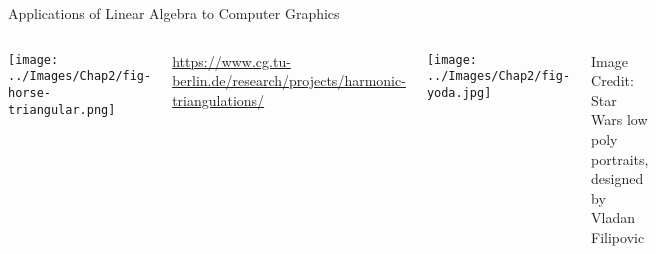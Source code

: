 \documentclass[xcoler=dvipsnames, aspectratio=169]{beamer}
\date{Applications to Computer Graphics}
\begin{document}
\begin{frame}{Applications of Linear Algebra to Computer Graphics}


\begin{columns}[T]

\column{0.5\tw}

\texttt{[image: ../Images/Chap2/fig-horse-triangular.png]}

{\tiny \href{https://www.cg.tu-berlin.de/research/projects/harmonic-triangulations/}{\alert{https://www.cg.tu-berlin.de/research/projects/harmonic-triangulations/}}}

\column{0.5\tw}

\texttt{[image: ../Images/Chap2/fig-yoda.jpg]}

{\tiny Image Credit: Star Wars low poly portraits, designed by Vladan Filipovic}

\bs


\end{columns}

\end{frame}
\end{document}
